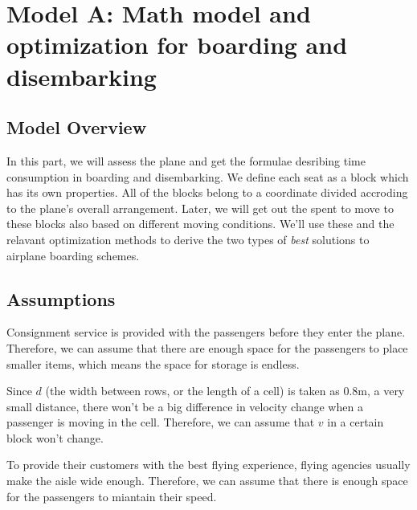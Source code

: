 \documentclass{article}
\begin{document}
	\section{Model A: Math model and optimization for boarding and disembarking}
	\subsection{Model Overview}
	In this part, we will assess the plane and get the formulae desribing time consumption in boarding and disembarking. We define each seat as a block which has its own properties. All of the blocks belong to a coordinate divided accroding to the plane's overall arrangement. Later, we will get out the spent to move to these blocks also based on different moving conditions. We'll use these and the relavant optimization methods to derive the two types of \textit{best} solutions to airplane boarding schemes.
	\subsection{Assumptions}
	\begin{enumerate}

		Consignment service is provided with the passengers before they enter the plane. Therefore, we can assume that there are enough space for the passengers to place smaller items, which means the space for storage is endless.

		Since $d$ (the width between rows, or the length of a cell) is taken as 0.8$\mathrm{m}$, a very small distance, there won't be a big difference in velocity change when a passenger is moving in the cell. Therefore, we can assume that $v$ in a certain block won't change.

		To provide their customers with the best flying experience, flying agencies usually make the aisle wide enough.  Therefore, we can assume that there is enough space for the passengers to miantain their speed.
	\end{enumerate}
\end{document}
